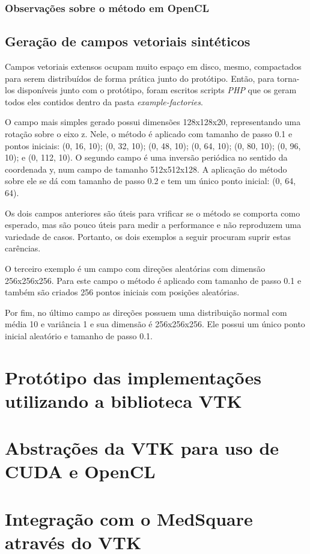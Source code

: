     \subsubsection{Observações sobre o método em OpenCL}
    
  \subsection{Geração de campos vetoriais sintéticos}
  Campos vetoriais extensos ocupam muito espaço em disco, mesmo, compactados para serem distribuídos de forma prática junto do protótipo. Então, para torna-los disponíveis junto com o protótipo, foram escritos scripts \textit{PHP} que os geram todos eles contidos dentro da pasta \textit{example-factories}.
  
  O campo mais simples gerado possui dimensões 128x128x20, representando uma rotação sobre o eixo z. Nele, o método é aplicado com tamanho de passo 0.1 e pontos iniciais: (0, 16, 10); (0, 32, 10); (0, 48, 10); (0, 64, 10); (0, 80, 10); (0, 96, 10); e  (0, 112, 10). O segundo campo é uma inversão periódica no sentido da coordenada y, num campo de tamanho 512x512x128. A aplicação do método sobre ele se dá com tamanho de passo 0.2 e tem um único ponto inicial: (0, 64, 64).
  
  Os dois campos anteriores são úteis para vrificar se o método se comporta como esperado, mas são pouco úteis para medir a performance e não reproduzem uma variedade de casos. Portanto, os dois exemplos a seguir procuram suprir estas carências.
  
  O terceiro exemplo é um campo com direções aleatórias com dimensão 256x256x256. Para este campo o método é aplicado com tamanho de passo 0.1 e também são criados 256 pontos iniciais com posições aleatórias.
  
  Por fim, no último campo as direções possuem uma distribuição normal com média 10 e variância 1 e sua dimensão é 256x256x256. Ele possui um único ponto inicial aleatório e tamanho de passo 0.1.

\section{Protótipo das implementações utilizando a biblioteca VTK}
\section{Abstrações da VTK para uso de CUDA e OpenCL}
\section{Integração com o MedSquare através do VTK}
